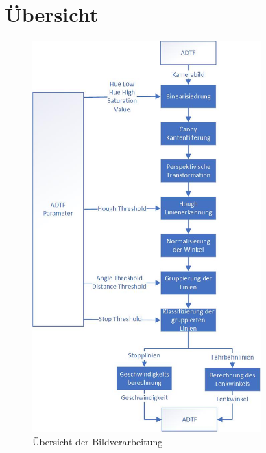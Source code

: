 \documentclass[a4paper,12pt]{report}
\begin{document}


\pagebreak

\section{Übersicht}
	\begin{figure}[ht]
		\centering
		\includegraphics[width=250pt,keepaspectratio]{assets/bvaFlowchart.jpg}
		\caption{Übersicht der Bildverarbeitung}
		\label{img-bvaFlowchart}
	\end{figure}

\pagebreak
\end{document}
